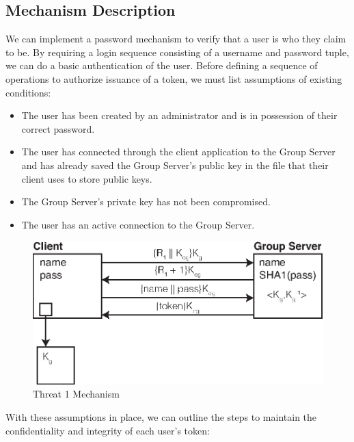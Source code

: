 \documentclass[11pt]{article}
\begin{document}
\subsection{Mechanism Description}
We can implement a password mechanism to verify that a user is who they claim to be. By requiring a login sequence consisting of a username and password tuple, we can do a basic authentication of the user. Before defining a sequence of operations to authorize issuance of a token, we must list assumptions of existing conditions:
\begin{itemize}
\item{}The user has been created by an administrator and is in possession of their correct password.
\item{}The user has connected through the client application to the Group Server and has already saved the Group Server's public key in the file that their client uses to store public keys.
\item{}The Group Server's private key has not been compromised.
\item{}The user has an active connection to the Group Server.
\end{itemize}
\begin{figure}[htbp]
\begin{center}
\includegraphics{threat1.eps}
\caption{Threat 1 Mechanism}
\label{threat1}
\end{center}
\end{figure}
With these assumptions in place, we can outline the steps to maintain the confidentiality and integrity of each user's token:
\end{document}
